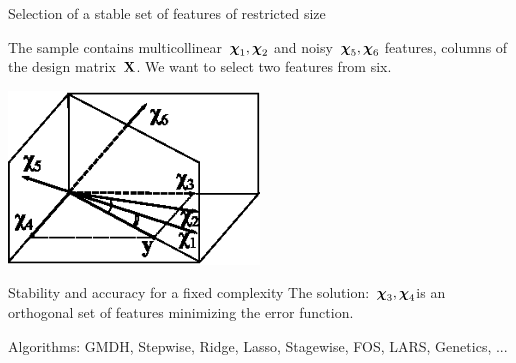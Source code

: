\documentclass{beamer}
\begin{document}
\begin{frame}[c]{Selection of a stable set of features of restricted size}

{\small
The sample contains multicollinear~${\boldsymbol{\chi}}_1, {\boldsymbol{\chi}}_2$ and noisy~${\boldsymbol{\chi}}_5,{\boldsymbol{\chi}}_6$ features, columns of the design matrix~${\mathbf{X}}$. We want to select two features from six.}

\begin{center}
\includegraphics[width=0.5\textwidth]{exp3_1.eps}
\end{center}

\begin{block}{Stability and accuracy for a fixed complexity}
The solution:~${\boldsymbol{\chi}}_3,{\boldsymbol{\chi}}_4$is an orthogonal set of features minimizing the error function.
\end{block}

{\tiny Algorithms: GMDH, Stepwise, Ridge, Lasso, Stagewise, FOS, LARS, Genetics, ... }

\end{frame}
\end{document}
